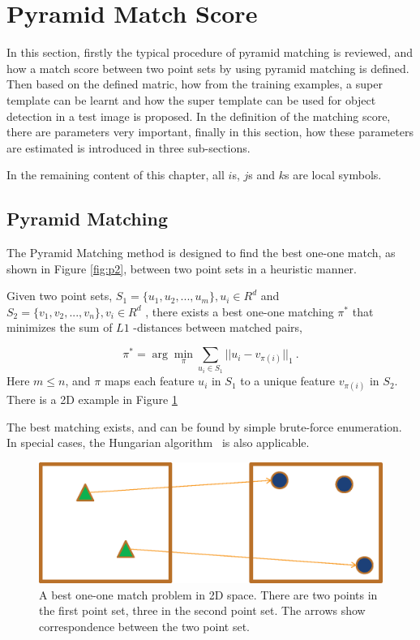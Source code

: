\section{Pyramid Match Score}

\label{dt5}
In this section, firstly the typical procedure of pyramid matching is reviewed, and how a match score between two point sets by using pyramid matching is defined. Then based on the defined matric, how from the training examples, a super template can be learnt and how the super template can be used for object detection in a test image is proposed. In the definition of the matching score, there are parameters very important, finally in this section, how these parameters are estimated is introduced in three sub-sections.

In the remaining content of this chapter, all $i$s, $j$s and $k$s are local symbols.
\subsection{Pyramid Matching}



The Pyramid Matching method is designed to find the best one-one match, as shown in Figure \ref{fig:p2}, between two point sets in a heuristic manner.

Given two point sets, ${S_1} = \{ {u_1},{u_2},...,{u_m}\}, u_i \in {R^d}
$
 and ${S_2} = \{ {v_1},{v_2},...,{v_n}\}, v_i \in {R^d}$
, there exists a best one-one matching ${\pi}^*$ that minimizes the sum of $L1$
-distances between matched pairs,

\[
{\pi ^*} = \arg \mathop {\min }\limits_\pi  \sum\limits_{{u_i} \in {S_1}} {||{u_i} - {v_{\pi (i)}}|{|_1}} \ .
\]
Here $m  \le n$, and $\pi$ maps each feature $u_i$ in $S_1$ to a unique feature ${{v_{\pi (i)}}}
$ in $S_2$. There is a 2D example in Figure \ref{fig:pms1}

The best matching exists, and can be found by simple brute-force enumeration. In special cases, the Hungarian algorithm~\citep{ha} is also applicable.

\begin{figure}
\centering
\includegraphics[width=1\textwidth]{pms1.eps}
\caption[Best one-one match.]{A best one-one match problem in 2D space. There are two points in the first point set, three in the second point set. The arrows show correspondence between the two point set.}
\label{fig:pms1}
\end{figure}


